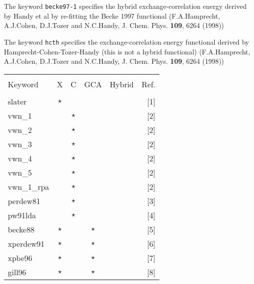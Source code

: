 The keyword \verb+becke97-1+ specifies  the hybrid exchange-correlation energy
derived by Handy et al by re-fitting the Becke 1997 functional
(F.A.Hamprecht, A.J.Cohen, D.J.Tozer and N.C.Handy, 
    J. Chem. Phys. {\bf 109}, 6264 (1998))

The keyword \verb+hcth+ specifies the  exchange-correlation energy 
functional derived by Hamprecht-Cohen-Tozer-Handy 
(this is not a hybrid functional)
(F.A.Hamprecht, A.J.Cohen, D.J.Tozer and N.C.Handy, 
    J. Chem. Phys. {\bf 109}, 6264 (1998))
\twocolumn
\begin{table}[htp]

\begin{tabular}{|l|cccc|r|}
\hline
           &          &             &        &         &         \\
Keyword    & X & C & GCA    &  Hybrid & Ref.\\
           &          &             &        &         &         \\
\hline
 slater     & $\star$    &            &         &         &[1]\\
\hline                                                  
vwn\_1     &          &   $\star$     &         &        &[2]     \\
vwn\_2     &          &   $\star$     &         &        &[2]    \\
vwn\_3     &          &   $\star$     &         &        &[2]     \\
vwn\_4     &          &   $\star$     &         &        &[2]     \\
vwn\_5     &          &   $\star$     &         &        &[2]     \\
vwn\_1\_rpa&          &   $\star$     &         &        &[2]     \\
perdew81   &          &   $\star$     &         &        &[3]     \\
pw91lda    &          &   $\star$     &         &        &[4]\\
\hline                                                  
becke88    & $\star$    &             &  $\star$  &        &[5]\\
xperdew91  & $\star$    &             &  $\star$  &        &[6]\\
xpbe96     & $\star$    &             &  $\star$  &        &[7]\\
gill96     & $\star$    &             &  $\star$  &        &[8]\\
\hline                                                  

\end{tabular}
\end{table}
